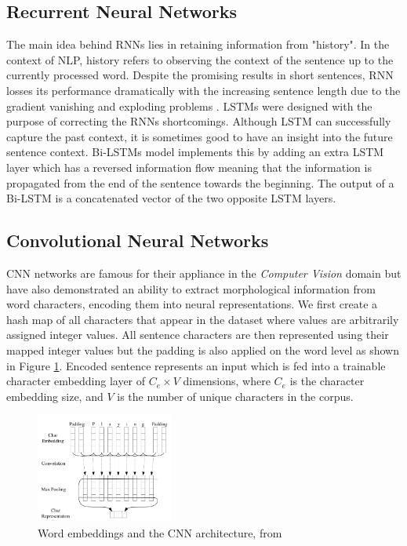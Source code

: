 \documentclass[10pt, a4paper]{article}
\begin{document}
\subsection{Recurrent Neural Networks}

The main idea behind RNNs lies in retaining information from "history". In the 
context of NLP, history refers to observing the context of the sentence up to the
currently processed word. Despite the promising results in short sentences, RNN
losses its performance dramatically with the increasing sentence length due to 
the gradient vanishing \citep{bengio1994learning} and exploding problems 
\citep{pascanu2013difficulty}. LSTMs were designed with the purpose of correcting 
the RNNs shortcomings. Although LSTM can successfully capture the past context,
it is sometimes good to have an insight into the future sentence context. Bi-LSTMs 
model implements this by adding an extra LSTM layer which has a reversed information flow
meaning that the information is propagated from the end of the sentence towards
the beginning. The output of a Bi-LSTM is a concatenated vector of the two opposite LSTM layers.

\subsection{Convolutional Neural Networks}
CNN networks are famous for their appliance in the \emph{Computer Vision}
domain but have also demonstrated an ability to extract morphological information
from word characters, encoding them into neural representations. We first create
a hash map of all characters that appear in the dataset where values are arbitrarily
assigned integer values. All sentence characters are then represented using their
mapped integer values but the padding is also applied on the word level as shown
in Figure \ref{fig:cnn_embed}. Encoded sentence represents an input which is fed
into a trainable character embedding layer of $C_e \times V$ dimensions, where
$C_e$ is the character embedding size, and $V$ is the number of unique
characters in the corpus.

\begin{figure}
  \caption{Word embeddings and the CNN architecture, from \citep{ma2016end}}
  \label{fig:cnn_embed}
  \centering
    \includegraphics[width=0.4\textwidth]{imgs/cnn_embed.png}
\end{figure}
\end{document}
